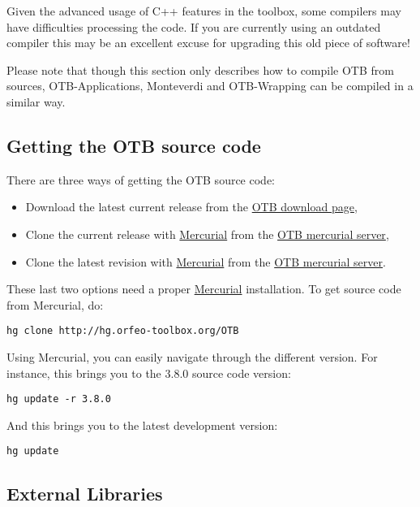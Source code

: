Given the advanced usage of C++ features in the toolbox, some
compilers may have difficulties processing the code. If you are
currently using an outdated compiler this may be an excellent excuse
for upgrading this old piece of software!

Please note that though this section only describes how to compile OTB from sources,
OTB-Applications, Monteverdi and OTB-Wrapping can be compiled in a similar way.

\subsection{Getting the OTB source code}

There are three ways of getting the OTB source code:
\begin{itemize}
\item Download the latest current release from the \href{http://sourceforge.net/projects/orfeo-toolbox/}{OTB download page},
\item Clone the current release with \href{http://mercurial.selenic.com}{Mercurial} from the \href{http://hg.orfeo-toolbox.org/OTB}{OTB mercurial server},
\item Clone the latest revision with \href{http://mercurial.selenic.com}{Mercurial} from the \href{http://hg.orfeo-toolbox.org/OTB}{OTB mercurial server}.
\end{itemize}

These last two options need a proper \href{http://mercurial.selenic.com}{Mercurial} installation. To get source code from Mercurial, do:
\begin{verbatim}
hg clone http://hg.orfeo-toolbox.org/OTB
\end{verbatim}

Using Mercurial, you can easily navigate through the different version. For instance, this brings you to the 3.8.0 source code version:
\begin{verbatim}
hg update -r 3.8.0
\end{verbatim}

And this brings you to the latest development version:
\begin{verbatim}
hg update
\end{verbatim}


\subsection{External Libraries}

